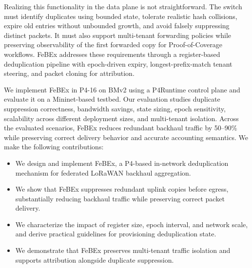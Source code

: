 Realizing this functionality in the data plane is not straightforward. The switch must identify duplicates using bounded state, tolerate realistic hash collisions, expire old entries without unbounded growth, and avoid falsely suppressing distinct packets. It must also support multi-tenant forwarding policies while preserving observability of the first forwarded copy for Proof-of-Coverage workflows. FeBEx addresses these requirements through a register-based deduplication pipeline with epoch-driven expiry, longest-prefix-match tenant steering, and packet cloning for attribution.

We implement FeBEx in P4-16 on BMv2 using a P4Runtime control plane and evaluate it on a Mininet-based testbed. Our evaluation studies duplicate suppression correctness, bandwidth savings, state sizing, epoch sensitivity, scalability across different deployment sizes, and multi-tenant isolation. Across the evaluated scenarios, FeBEx reduces redundant backhaul traffic by 50--90\% while preserving correct delivery behavior and accurate accounting semantics. We make the following contributions:
\begin{itemize}
    \item We design and implement FeBEx, a P4-based in-network deduplication mechanism for federated LoRaWAN backhaul aggregation.
    \item We show that FeBEx suppresses redundant uplink copies before egress, substantially reducing backhaul traffic while preserving correct packet delivery.
    \item We characterize the impact of register size, epoch interval, and network scale, and derive practical guidelines for provisioning deduplication state.
    \item We demonstrate that FeBEx preserves multi-tenant traffic isolation and supports attribution alongside duplicate suppression.
\end{itemize}




